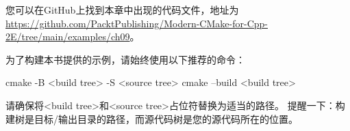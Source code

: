 您可以在GitHub上找到本章中出现的代码文件，地址为 \url{https://github.com/PacktPublishing/Modern-CMake-for-Cpp-2E/tree/main/examples/ch09}。

为了构建本书提供的示例，请始终使用以下推荐的命令：

\begin{shell}
cmake -B <build tree> -S <source tree>
cmake --build <build tree>
\end{shell}

请确保将<build tree>和<source tree>占位符替换为适当的路径。 提醒一下：构建树是目标/输出目录的路径，而源代码树是您的源代码所在的位置。